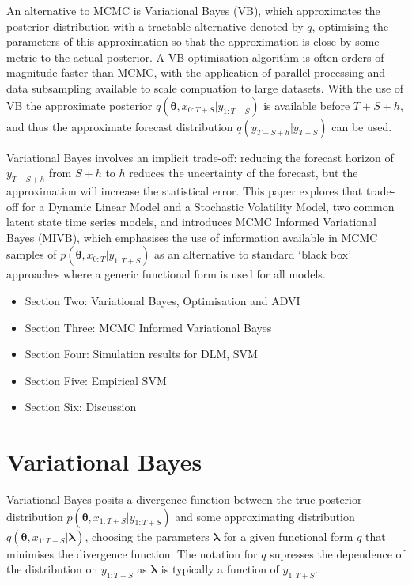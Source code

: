 \documentclass[12pt,a4paper]{article}%
\numberwithin{equation}{section}
\begin{document}
An alternative to MCMC is Variational Bayes (VB), which approximates the posterior distribution with a tractable alternative denoted by $q$, optimising the parameters of this approximation so that the approximation is close by some metric to the actual posterior. A VB optimisation algorithm is often orders of magnitude faster than MCMC, with the application of parallel processing and data subsampling available to scale compuation to large datasets. With the use of VB the approximate posterior $q(\boldsymbol{\theta}, x_{0:T+S} | y_{1:T+S})$ is available before $T+S+h$, and thus the approximate forecast distribution $q(y_{T+S+h} | y_{T+S})$ can be used.

Variational Bayes involves an implicit trade-off: reducing the forecast horizon of $y_{T+S+h}$ from $S+h$ to $h$ reduces the uncertainty of the forecast, but the approximation will increase the statistical error. This paper explores that trade-off for a Dynamic Linear Model and a Stochastic Volatility Model, two common latent state time series models, and introduces MCMC Informed Variational Bayes (MIVB), which emphasises the use of information available in MCMC samples of $p(\boldsymbol{\theta}, x_{0:T} | y_{1:T+S})$ as an alternative to standard `black box' approaches where a generic functional form is used for all models.

\begin{itemize}
\item Section Two: Variational Bayes, Optimisation and ADVI
\item Section Three: MCMC Informed Variational Bayes
\item Section Four: Simulation results for DLM, SVM
\item Section Five: Empirical SVM
\item Section Six: Discussion
\end{itemize}

\section{Variational Bayes}
\label{VB}
Variational Bayes posits a divergence function between the true posterior distribution $p(\boldsymbol{\theta}, x_{1:T+S} | y_{1:T+S})$ and some approximating distribution $q(\boldsymbol{\theta}, x_{1:T+S} | \boldsymbol{\lambda})$, choosing the parameters $\boldsymbol{\lambda}$ for a given functional form $q$ that minimises the divergence function. The notation for $q$ supresses the dependence of the distribution on $y_{1:T+S}$ as $\boldsymbol{\lambda}$ is typically a function of $y_{1:T+S}$.
\end{document}
